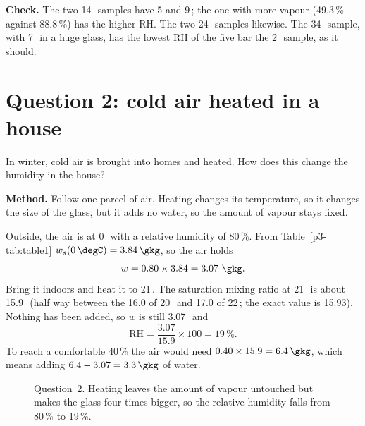 \textbf{Check.} The two 14\,\degC\ samples have 5 and 9\,\gkg; the one with more vapour (49.3\,\% against 88.8\,\%) has the higher RH. The two 24\,\degC\ samples likewise. The 34\,\degC\ sample, with 7\,\gkg\ in a huge glass, has the lowest RH of the five bar the 2\,\gkg\ sample, as it should.

\section{Question 2: cold air heated in a house}\label{p3-sec:q2}

\begin{questionbox}
In winter, cold air is brought into homes and heated. How does this change the humidity in the house?
\end{questionbox}

\textbf{Method.} Follow one parcel of air. Heating changes its temperature, so it changes the size of the glass, but it adds no water, so the amount of vapour stays fixed.

\begin{workedbox}
Outside, the air is at 0\,\degC\ with a relative humidity of 80\,\%. From Table~\ref{p3-tab:table1} $w_s(0\,\degC)=3.84\,\gkg$, so the air holds
\[
w=0.80\times3.84=3.07\ \gkg.
\]
Bring it indoors and heat it to 21\,\degC. The saturation mixing ratio at 21\,\degC\ is about 15.9\,\gkg\ (half way between the 16.0 of 20\,\degC\ and 17.0 of 22\,\degC; the exact value is 15.93). Nothing has been added, so $w$ is still 3.07\,\gkg\ and
\[
\mathrm{RH}=\frac{3.07}{15.9}\times100=19\,\%.
\]
To reach a comfortable 40\,\% the air would need $0.40\times15.9=6.4\,\gkg$, which means adding $6.4-3.07=3.3\,\gkg$ of water.
\end{workedbox}

\begin{figure}[ht]
\centering
{}
\caption{Question~2. Heating leaves the amount of vapour untouched but makes the glass four times bigger, so the relative humidity falls from 80\,\% to 19\,\%.}
\end{figure}

